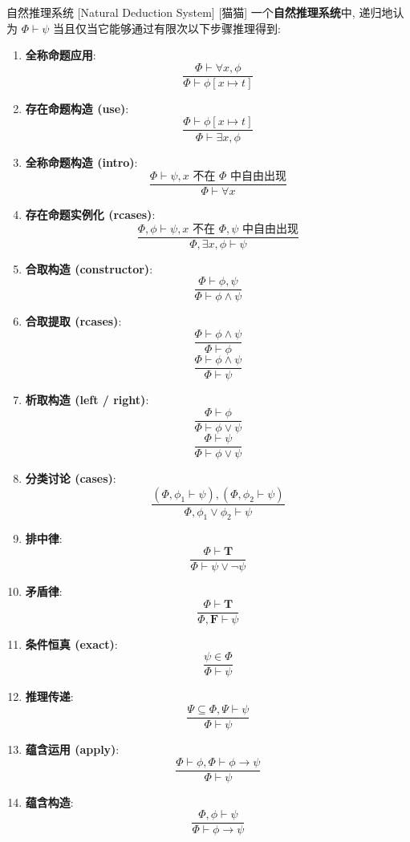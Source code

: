 \documentclass[UTF8]{ctexart}
\newcommand{\LT}{\ensuremath{\mathbf{T}}}
\newcommand{\LF}{\ensuremath{\mathbf{F}}}
\begin{document}
            \begin{dfn}
                []
                {自然推理系统}
                [Natural Deduction System]
                [猫猫]
                一个\textbf{自然推理系统}中, 递归地认为 \(\Phi\vdash\psi\) 当且仅当它能够通过有限次以下步骤推理得到: 
                \begin{enumerate}
                    \item \textbf{全称命题应用}: 
                    \[\frac{\Phi\vdash\forall x, \phi}{\Phi\vdash\phi[x\mapsto t]}\]
                    \item \textbf{存在命题构造 (use)}: 
                    \[\frac{\Phi\vdash\phi[x\mapsto t]}{\Phi\vdash\exists x, \phi}\]
                    \item \textbf{全称命题构造 (intro)}: 
                    \[\frac{\Phi\vdash\psi, \text{\(x\) 不在 \(\Phi\) 中自由出现}}{\Phi\vdash\forall x}\]
                    \item \textbf{存在命题实例化 (rcases)}: 
                    \[\frac{\Phi, \phi\vdash\psi, \text{\(x\) 不在 \(\Phi,\psi\) 中自由出现}}{\Phi,\exists x, \phi\vdash\psi}\]
                    \item \textbf{合取构造 (constructor)}: 
                    \[\frac{\Phi\vdash\phi,\psi}{\Phi\vdash\phi\land\psi}\]
                    \item \textbf{合取提取 (rcases)}: 
                    \[\frac{\Phi\vdash\phi\land\psi}{\Phi\vdash\phi}\]
                    \[\frac{\Phi\vdash\phi\land\psi}{\Phi\vdash\psi}\]
                    \item \textbf{析取构造 (left / right)}: 
                    \[\frac{\Phi\vdash\phi}{\Phi\vdash\phi\lor\psi}\]
                    \[\frac{\Phi\vdash\psi}{\Phi\vdash\phi\lor\psi}\]
                    \item \textbf{分类讨论 (cases)}: 
                    \[\frac{(\Phi, \phi_1\vdash\psi), (\Phi, \phi_2\vdash\psi)}{\Phi, \phi_1\lor\phi_2\vdash\psi}\]
                    \item \textbf{排中律}: 
                    \[\frac{\Phi\vdash\LT}{\Phi\vdash\psi\lor\neg\psi}\]
                    \item \textbf{矛盾律}: 
                    \[\frac{\Phi\vdash\LT}{\Phi,\LF\vdash\psi}\]
                    \item \textbf{条件恒真 (exact)}: 
                    \[\frac{\psi\in\Phi}{\Phi\vdash\psi}\]
                    \item \textbf{推理传递}: 
                    \[\frac{\Psi\subseteq\Phi, \Psi\vdash\psi}{\Phi\vdash\psi}\]
                    \item \textbf{蕴含运用 (apply)}: 
                    \[\frac{\Phi\vdash\phi, \Phi\vdash\phi\to\psi}{\Phi\vdash\psi}\]
                    \item \textbf{蕴含构造}: 
                    \[\frac{\Phi,\phi\vdash\psi}{\Phi\vdash\phi\to\psi}\]
                \end{enumerate}
            \end{dfn}
            
\end{document}
